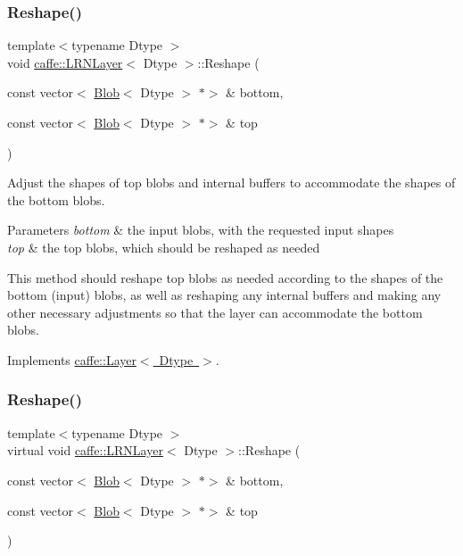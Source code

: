 \subsubsection{\texorpdfstring{Reshape()}{Reshape()}\hspace{0.1cm}{\footnotesize\ttfamily [1/2]}}
{\footnotesize\ttfamily template$<$typename Dtype $>$ \\
void \mbox{\hyperlink{classcaffe_1_1_l_r_n_layer}{caffe\+::\+L\+R\+N\+Layer}}$<$ Dtype $>$\+::Reshape (\begin{DoxyParamCaption}\item[{const vector$<$ \mbox{\hyperlink{classcaffe_1_1_blob}{Blob}}$<$ Dtype $>$ $\ast$$>$ \&}]{bottom,  }\item[{const vector$<$ \mbox{\hyperlink{classcaffe_1_1_blob}{Blob}}$<$ Dtype $>$ $\ast$$>$ \&}]{top }\end{DoxyParamCaption})\hspace{0.3cm}{\ttfamily [virtual]}}



Adjust the shapes of top blobs and internal buffers to accommodate the shapes of the bottom blobs. 


\begin{DoxyParams}{Parameters}
{\em bottom} & the input blobs, with the requested input shapes \\
\hline
{\em top} & the top blobs, which should be reshaped as needed\\
\hline
\end{DoxyParams}
This method should reshape top blobs as needed according to the shapes of the bottom (input) blobs, as well as reshaping any internal buffers and making any other necessary adjustments so that the layer can accommodate the bottom blobs. 

Implements \mbox{\hyperlink{classcaffe_1_1_layer_a7fe981e8af8d93d587acf2a952be563d}{caffe\+::\+Layer$<$ Dtype $>$}}.

\mbox{\label{classcaffe_1_1_l_r_n_layer_a5dd9938f40f479d6fd1de59becd09bdf}} 
\subsubsection{\texorpdfstring{Reshape()}{Reshape()}\hspace{0.1cm}{\footnotesize\ttfamily [2/2]}}
{\footnotesize\ttfamily template$<$typename Dtype $>$ \\
virtual void \mbox{\hyperlink{classcaffe_1_1_l_r_n_layer}{caffe\+::\+L\+R\+N\+Layer}}$<$ Dtype $>$\+::Reshape (\begin{DoxyParamCaption}\item[{const vector$<$ \mbox{\hyperlink{classcaffe_1_1_blob}{Blob}}$<$ Dtype $>$ $\ast$$>$ \&}]{bottom,  }\item[{const vector$<$ \mbox{\hyperlink{classcaffe_1_1_blob}{Blob}}$<$ Dtype $>$ $\ast$$>$ \&}]{top }\end{DoxyParamCaption})\hspace{0.3cm}{\ttfamily [virtual]}}



